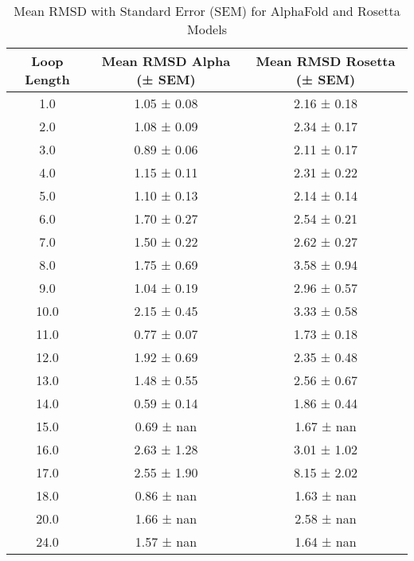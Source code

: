 \begin{table}[ht]
\centering
\begin{tabular}{ccc}
\toprule
\textbf{Loop Length} & \textbf{Mean RMSD Alpha (± SEM)} & \textbf{Mean RMSD Rosetta (± SEM)} \\
\midrule
1.0 & 1.05 ± 0.08 & 2.16 ± 0.18 \\ 
2.0 & 1.08 ± 0.09 & 2.34 ± 0.17 \\ 
3.0 & 0.89 ± 0.06 & 2.11 ± 0.17 \\ 
4.0 & 1.15 ± 0.11 & 2.31 ± 0.22 \\ 
5.0 & 1.10 ± 0.13 & 2.14 ± 0.14 \\ 
6.0 & 1.70 ± 0.27 & 2.54 ± 0.21 \\ 
7.0 & 1.50 ± 0.22 & 2.62 ± 0.27 \\ 
8.0 & 1.75 ± 0.69 & 3.58 ± 0.94 \\ 
9.0 & 1.04 ± 0.19 & 2.96 ± 0.57 \\ 
10.0 & 2.15 ± 0.45 & 3.33 ± 0.58 \\ 
11.0 & 0.77 ± 0.07 & 1.73 ± 0.18 \\ 
12.0 & 1.92 ± 0.69 & 2.35 ± 0.48 \\ 
13.0 & 1.48 ± 0.55 & 2.56 ± 0.67 \\ 
14.0 & 0.59 ± 0.14 & 1.86 ± 0.44 \\ 
15.0 & 0.69 ± nan & 1.67 ± nan \\ 
16.0 & 2.63 ± 1.28 & 3.01 ± 1.02 \\ 
17.0 & 2.55 ± 1.90 & 8.15 ± 2.02 \\ 
18.0 & 0.86 ± nan & 1.63 ± nan \\ 
20.0 & 1.66 ± nan & 2.58 ± nan \\ 
24.0 & 1.57 ± nan & 1.64 ± nan \\ 
\bottomrule
\end{tabular}
\caption{Mean RMSD with Standard Error (SEM) for AlphaFold and Rosetta Models}
\label{table:rmsd_alpha_rosetta}
\end{table}
